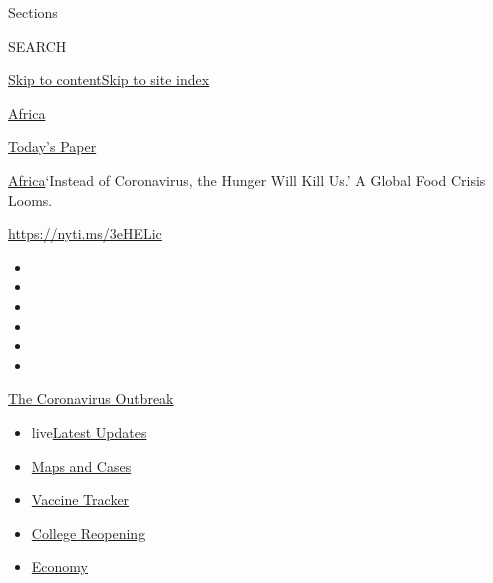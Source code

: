 Sections

SEARCH

\protect\hyperlink{site-content}{Skip to
content}\protect\hyperlink{site-index}{Skip to site index}

\href{https://www.nytimes.com/section/world/africa}{Africa}

\href{https://myaccount.nytimes.com/auth/login?response_type=cookie\&client_id=vi}{}

\href{https://www.nytimes.com/section/todayspaper}{Today's Paper}

\href{/section/world/africa}{Africa}\textbar{}`Instead of Coronavirus,
the Hunger Will Kill Us.' A Global Food Crisis Looms.

\url{https://nyti.ms/3eHELic}

\begin{itemize}
\item
\item
\item
\item
\item
\item
\end{itemize}

\href{https://www.nytimes.com/news-event/coronavirus?action=click\&pgtype=Article\&state=default\&region=TOP_BANNER\&context=storylines_menu}{The
Coronavirus Outbreak}

\begin{itemize}
\tightlist
\item
  live\href{https://www.nytimes.com/2020/08/04/world/coronavirus-covid-19.html?action=click\&pgtype=Article\&state=default\&region=TOP_BANNER\&context=storylines_menu}{Latest
  Updates}
\item
  \href{https://www.nytimes.com/interactive/2020/us/coronavirus-us-cases.html?action=click\&pgtype=Article\&state=default\&region=TOP_BANNER\&context=storylines_menu}{Maps
  and Cases}
\item
  \href{https://www.nytimes.com/interactive/2020/science/coronavirus-vaccine-tracker.html?action=click\&pgtype=Article\&state=default\&region=TOP_BANNER\&context=storylines_menu}{Vaccine
  Tracker}
\item
  \href{https://www.nytimes.com/2020/08/02/us/covid-college-reopening.html?action=click\&pgtype=Article\&state=default\&region=TOP_BANNER\&context=storylines_menu}{College
  Reopening}
\item
  \href{https://www.nytimes.com/live/2020/08/03/business/stock-market-today-coronavirus?action=click\&pgtype=Article\&state=default\&region=TOP_BANNER\&context=storylines_menu}{Economy}
\end{itemize}

